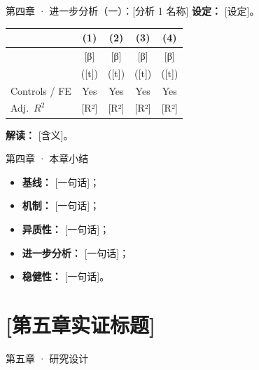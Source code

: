 \documentclass[10pt,aspectratio=169]{beamer}
\begin{document}

\begin{frame}{第四章 · 进一步分析（一）：[分析 1 名称]}
  \textbf{设定：} [设定]。

  \vspace{0.3em}
  \centering\small
  \begin{tabular}{lcccc}
    \toprule
              & (1) & (2) & (3) & (4) \\
    \midrule
    [X]       & [β] & [β] & [β] & [β] \\
              & ([t])& ([t])& ([t])& ([t])\\
    \midrule
    Controls / FE & Yes & Yes & Yes & Yes \\
    Adj.\ $R^{2}$ & [R²]& [R²]& [R²]& [R²]\\
    \bottomrule
  \end{tabular}

  \vspace{0.4em}
  \textbf{解读：} [含义]。
\end{frame}

\begin{frame}{第四章 · 本章小结}
  \begin{itemize}
    \item \textbf{基线：} [一句话]；
    \item \textbf{机制：} [一句话]；
    \item \textbf{异质性：} [一句话]；
    \item \textbf{进一步分析：} [一句话]；
    \item \textbf{稳健性：} [一句话]。
  \end{itemize}
\end{frame}

\section{[第五章实证标题]}


\begin{frame}{第五章 · 研究设计}
\end{frame}
\end{document}
